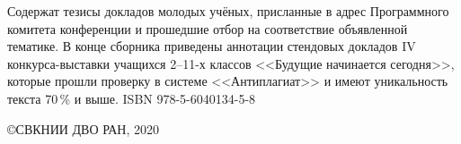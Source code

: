 \vfill
\vfill
Содержат тезисы докладов молодых учёных, присланные в адрес Программного комитета конференции и прошедшие отбор на соответствие объявленной тематике. В конце сборника приведены аннотации стендовых докладов IV конкурса-выставки учащихся 2--11-х классов <<Будущие начинается сегодня>>, которые прошли проверку в системе <<Антиплагиат>> и имеют уникальность текста 70\,\% и выше.
\vfill
  \bigskip
\noindent ISBN 978-5-6040134-5-8
\hfill \begin{minipage}[t][3cm][t]{0.38\textwidth}
\copyright СВКНИИ ДВО РАН, 2020
\end{minipage}
